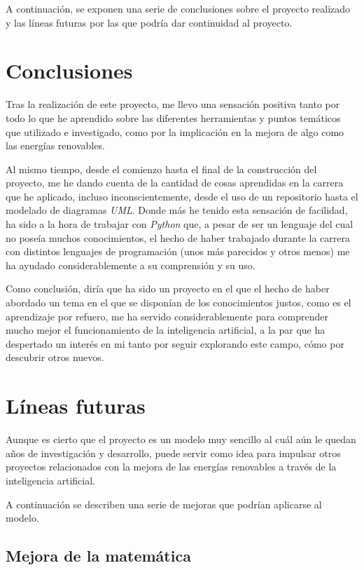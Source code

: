
A continuación, se exponen una serie de conclusiones sobre el proyecto realizado y las líneas futuras por las que podría dar continuidad al proyecto.


\section{Conclusiones}

Tras la realización de este proyecto, me llevo una sensación positiva tanto por todo lo que he aprendido sobre las diferentes herramientas y puntos temáticos que utilizado e investigado, como por la implicación en la mejora de algo como las energías renovables.

Al mismo tiempo, desde el comienzo hasta el final de la construcción del proyecto, me he dando cuenta de la cantidad de cosas aprendidas en la carrera que he aplicado, incluso inconscientemente, desde el uso de un repositorio hasta el modelado de diagramas \textit{UML}.
Donde más he tenido esta sensación de facilidad, ha sido a la hora de trabajar con \textit{Python} que, a pesar de ser un lenguaje del cual no poseía muchos conocimientos, el hecho de haber trabajado durante la carrera con distintos lenguajes de programación (unos más parecidos y otros menos) me ha ayudado considerablemente a su comprensión y su uso.

Como conclusión, diría que ha sido un proyecto en el que el hecho de haber abordado un tema en el que se disponían de los conocimientos justos, como es el aprendizaje por refuero, me ha servido considerablemente para comprender mucho mejor el funcionamiento de la inteligencia artificial, a la par que ha despertado un interés en mi tanto por seguir explorando este campo, cómo por descubrir otros nuevos.


\section{Líneas futuras}

Aunque es cierto que el proyecto es un modelo muy sencillo al cuál aún le quedan años de investigación y desarrollo, puede servir como idea para impulsar otros proyectos relacionados con la mejora de las energías renovables a través de la inteligencia artificial.

A continuación se describen una serie de mejoras que podrían aplicarse al modelo.

\subsection{Mejora de la matemática}


